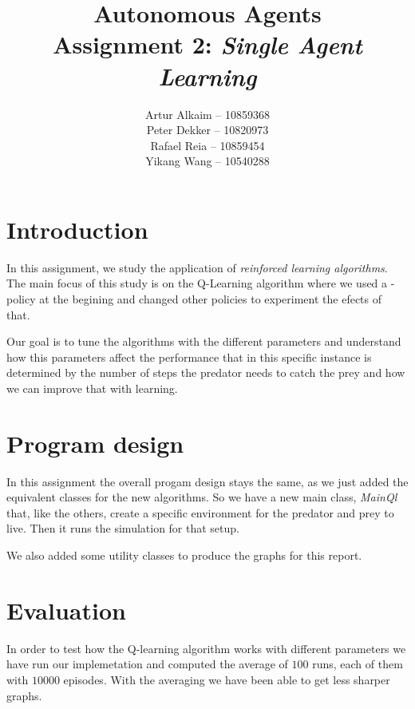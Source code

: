 \documentclass{article}
\begin{document}
\title{Autonomous Agents\\
Assignment 2: \emph{Single Agent Learning}}
\author{
Artur Alkaim -- 10859368\\
Peter Dekker -- 10820973\\
Rafael Reia -- 10859454\\
Yikang Wang -- 10540288\\
}
\maketitle
\section{Introduction}
In this assignment, we study the application of \emph{reinforced learning
algorithms}. The main focus of this study is on the Q-Learning algorithm where
we used a \epsilon-policy at the begining and changed other policies to experiment
the efects of that.

Our goal is to tune the algorithms with the different parameters and understand
how this parameters affect the performance that in this specific instance is
determined by the number of steps the predator needs to catch the prey and how
we can improve that with learning. 

\section{Program design}
In this assignment the overall progam design stays the same, as we just added
the equivalent classes for the new algorithms. So we have a new main class,
\emph{MainQl} that, like the others, create a specific environment for the
predator and prey to live. Then it runs the simulation for that setup.

We also added some utility classes to produce the graphs for this report.

\section{Evaluation}


In order to test how the Q-learning algorithm works with different parameters we
have run our implemetation and computed the average of $100$ runs, each of them
with $10000$ episodes. With the averaging we have been able to get less sharper
graphs.
\end{document}
